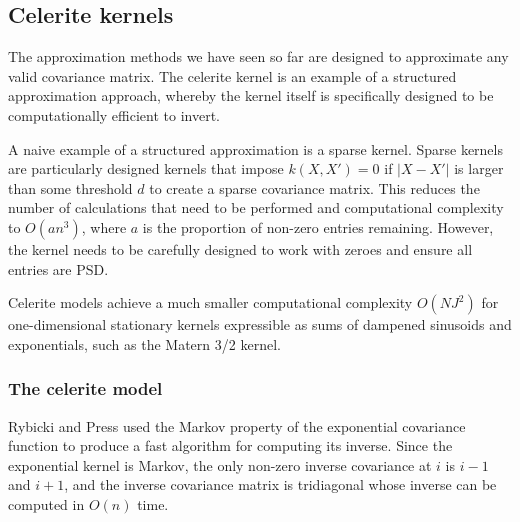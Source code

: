 

% 
% 
% 

\subsection{Celerite kernels}
The approximation methods we have seen so far are designed to approximate any valid covariance matrix. The celerite kernel is an example of a structured approximation approach, whereby the kernel itself is specifically designed to be computationally efficient to invert.

A naive example of a structured approximation is a sparse kernel. Sparse kernels \cite{big-data} are particularly designed kernels that impose $k(X,X') = 0$ if $|X - X'|$ is larger than some threshold $d$ to create a sparse covariance matrix. This reduces the number of calculations that need to be performed and computational complexity to $O(an^3)$, where $a$ is the proportion of non-zero entries remaining. However, the kernel needs to be carefully designed to work with zeroes and ensure all entries are PSD.

Celerite models achieve a much smaller computational complexity $O(N J^2)$ for one-dimensional stationary kernels expressible as sums of dampened sinusoids and exponentials, such as the Matern 3/2 kernel.

\subsubsection{The celerite model}
Rybicki and Press \cite{fast-exp} used the Markov property of the exponential covariance function to produce a fast algorithm for computing its inverse. Since the exponential kernel is Markov, the only non-zero inverse covariance at $i$ is $i-1$ and $i+1$, and the inverse covariance matrix is tridiagonal whose inverse can be computed in $O(n)$ time. 

